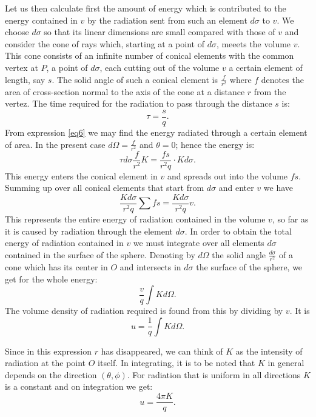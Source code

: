 \documentclass[12pt,oneside]{book}
\begin{document}
Let us then calculate first the amount of energy which is contributed to the energy contained in $v$ by the radiation sent from such an element $d\sigma$ to $v$. We choose $d\sigma$ so that its linear dimensions are small compared with those of $v$ and consider the cone of rays which, starting at a point of $d\sigma$, meeets the volume $v$. This cone consists of an infinite number of conical elements with the common vertex at $P$, a point of $d\sigma$, each cutting out of the volume $v$ a certain element of length, say $s$. The solid angle of such a conical element is $\frac{f}{r^2}$ where $f$ denotes the area of cross-section normal to the axis of the cone at a distance $r$ from the vertez. The time required for the radiation to pass through the distance $s$ is: 
$$\tau=\frac{s}{q}.$$
From expression \eqref{eq6} we may find the energy radiated through a certain element of area. In the present case $d\Omega =\frac{f}{r^2}$ and $\theta=0$; hence the energy is:
\begin{equation}
    \tau d\sigma \frac{f}{r^2}K=\frac{fs}{r^2q}\cdot Kd\sigma.
    \label{eq19}
\end{equation}
This energy enters the conical element in $v$ and spreads out into the volume $fs$. Summing up over all conical elements that start from $d\sigma$ and enter $v$ we have 
$$\frac{Kd\sigma}{r^2q}\sum fs=\frac{Kd\sigma}{r^2q}v.$$
This represents the entire energy of radiation contained in the volume $v$, so far as it is caused by radiation through the element $d\sigma$. In order to obtain the total energy of radiation contained in $v$ we must integrate over all elements $d\sigma$ contained in the surface of the sphere. Denoting by $d\Omega$ the solid angle $\frac{d\sigma}{r^2}$ of a cone which has its center in $O$ and intersects in $d\sigma$ the surface of the sphere, we get for the whole energy:
$$\frac{v}{q}\int Kd\Omega.$$
The volume density of radiation required is found from this by dividing by $v$. It is 
\begin{equation}
    u=\frac{1}{q}\int Kd\Omega.
    \label{eq20}
\end{equation} \par 

Since in this expression $r$ has disappeared, we can think of $K$ as the intensity of radiation at the point $O$ itself. In integrating, it is to be noted that $K$ in general depends on the direction $(\theta,\phi)$. For radiation that is uniform in all directions $K$ is a constant and on integration we get:
\begin{equation}
    u=\frac{4\pi K}{q}.
    \label{eq21}
\end{equation} \par 
\end{document}
